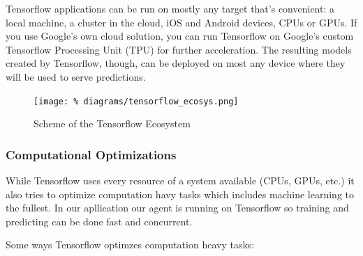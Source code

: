 Tensorflow applications can be run on mostly any target
that’s convenient: a local machine, a cluster in the cloud,
iOS and Android devices, CPUs or GPUs. If you use Google’s
own cloud solution, you can run Tensorflow on Google’s
custom Tensorflow Processing Unit (TPU) for further
acceleration. The resulting models created by Tensorflow,
though, can be deployed on most any device where they will
be used to serve predictions.\cite{david5}

\newpage

\begin{figure}[H]
  \centering
  \texttt{[image: \%
    diagrams/tensorflow\_ecosys.png]}
  \caption{Scheme of the Tensorflow Ecosystem\cite{david3}}
\end{figure}

\subsubsection{Computational Optimizations}

While Tensorflow uses every resource of a system available
(CPUs, GPUs, etc.) it also tries to optimize computation
havy tasks which includes machine learning to the fullest.
In our apllication our agent is running on Tensorflow so
training and predicting can be done fast and concurrent.

Some ways Tensorflow optimzes computation heavy tasks:

